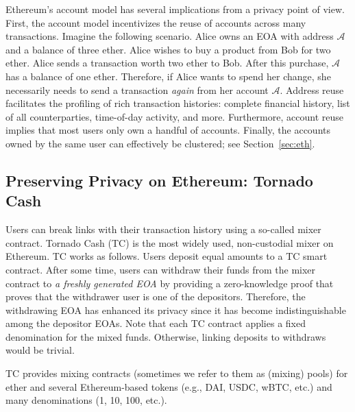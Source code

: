 Ethereum's account model has several implications from a privacy point of view. First, the account model incentivizes the reuse of accounts across many transactions. Imagine the following scenario. Alice owns an EOA with address $\mathcal{A}$ and a balance of three ether. Alice wishes to buy a product from Bob for two ether. Alice sends a transaction worth two ether to Bob. After this purchase, $\mathcal{A}$ has a balance of one ether. Therefore, if Alice wants to spend her change, she necessarily needs to send a transaction \emph{again} from her account $\mathcal{A}$. Address reuse facilitates the profiling of rich transaction histories: complete financial history,  list of all counterparties, time-of-day activity, and more. Furthermore, account reuse implies that most users only own a handful of accounts. Finally, the accounts owned by the same user can effectively be clustered; see Section~\ref{sec:eth}. 

\subsection{Preserving Privacy on Ethereum: Tornado Cash}
Users can break links with their transaction history using a so-called mixer contract. Tornado Cash (TC) is the most widely used, non-custodial mixer on Ethereum. TC works as follows. Users deposit equal amounts to a TC smart contract. After some time, users can withdraw their funds from the mixer contract to \emph{a freshly generated EOA} by providing a zero-knowledge proof that proves that the withdrawer user is one of the depositors. Therefore, the withdrawing EOA has enhanced its privacy since it has become indistinguishable among the depositor EOAs. Note that each TC contract applies a fixed denomination for the mixed funds. Otherwise, linking deposits to withdraws would be trivial.

TC provides mixing contracts (sometimes we refer to them as (mixing) pools) for ether and several Ethereum-based tokens (e.g., DAI, USDC, wBTC, etc.) and many denominations (1, 10, 100, etc.).
